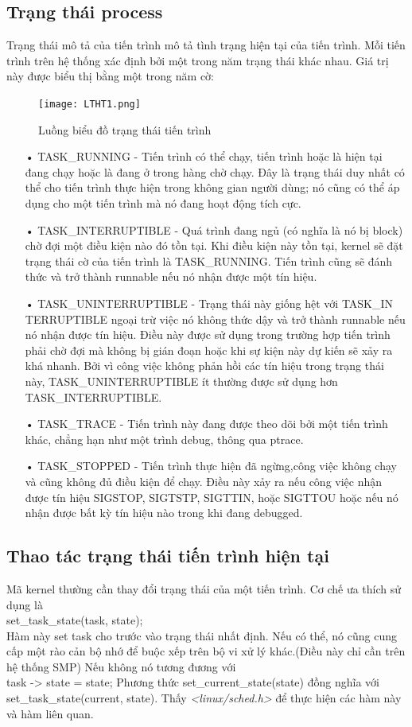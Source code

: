 \documentclass[a4paper,10pt]{report}
\begin{document}
\subsection{Trạng thái process}
Trạng thái mô tả của tiến trình mô tả tình trạng hiện tại của tiến trình. Mỗi tiến trình trên hệ thống xác định bởi một trong năm trạng thái khác nhau. Giá trị này được biểu thị bằng một trong năm cờ:
\begin{figure}[h]
\begin{center}
\texttt{[image: LTHT1.png]}
\caption{Luồng biểu đồ trạng thái tiến trình}
\end{center}
\end{figure}
\begin{itemize}
\item[•] TASK\_RUNNING - Tiến trình có thể chạy, tiến trình hoặc là hiện tại đang chạy hoặc là đang ở trong hàng chờ chạy. Đây là trạng thái duy nhất có thể cho tiến trình thực hiện trong không gian người dùng; nó cũng có thể áp dụng cho một tiến trình mà nó đang hoạt động tích cực.
\item[•] TASK\_INTERRUPTIBLE - Quá trình đang ngủ (có nghĩa là nó bị block) chờ đợi một điều kiện nào đó tồn tại. Khi điều kiện này tồn tại, kernel sẽ đặt trạng thái cờ của tiến trình là TASK\_RUNNING. Tiến trình cũng sẽ đánh thức và trở thành runnable nếu nó nhận được một tín hiệu.
\item[•] TASK\_UNINTERRUPTIBLE - Trạng thái này giống hệt với TASK\_IN
TERRUPTIBLE ngoại trừ việc nó không thức dậy và trở thành runnable nếu nó nhận được tín hiệu. Điều này được sử dụng trong trường hợp tiến trình phải chờ đợi mà không bị gián đoạn hoặc khi sự kiện này dự kiến sẽ xảy ra khá nhanh. Bởi vì công việc không phản hồi các tín hiệu trong trạng thái này, TASK\_UNINTERRUPTIBLE ít thường được sử dụng hơn TASK\_INTERRUPTIBLE.
\item[•] TASK\_TRACE - Tiến trình này đang được theo dõi bởi một tiến trình khác, chẳng hạn như một trình debug, thông qua ptrace.
\item[•] TASK\_STOPPED - Tiến trình thực hiện đã ngừng,công việc không chạy và cũng không đủ điều kiện để chạy. Điều này xảy ra nếu công việc nhận được tín hiệu SIGSTOP, SIGTSTP, SIGTTIN, hoặc SIGTTOU hoặc nếu nó nhận được bất kỳ tín hiệu nào trong khi đang debugged.
\end{itemize}
\subsection{Thao tác trạng thái tiến trình hiện tại}
Mã kernel thường cần thay đổi trạng thái của một tiến trình. Cơ chế ưa thích sử dụng là \\
set\_task\_state(task, state); \\
Hàm này set task cho trước vào trạng thái nhất định. Nếu có thể, nó cũng cung cấp một rào cản bộ nhớ để buộc xếp trên bộ vi xử lý khác.(Điều này chỉ cần trên hệ thống SMP) Nếu không nó tương đương với \\
task -> state = state;
Phương thức set\_current\_state(state) đồng nghĩa với set\_task\_state(current, state). Thấy \textit{<linux/sched.h>} để thực hiện các hàm này và hàm liên quan.
\end{document}
